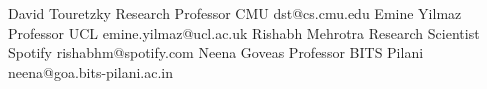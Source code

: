 %
%
%


\begin{referees}
		{David Touretzky}
		{Research Professor}
		{CMU}
		{dst@cs.cmu.edu}
		{Emine Yilmaz}
		{Professor}
		{UCL}
		{emine.yilmaz@ucl.ac.uk}
		{Rishabh Mehrotra}
		{Research Scientist}
		{Spotify}
		{rishabhm@spotify.com}
		{Neena Goveas}
		{Professor}
		{BITS Pilani}
		{neena@goa.bits-pilani.ac.in}
\end{referees}